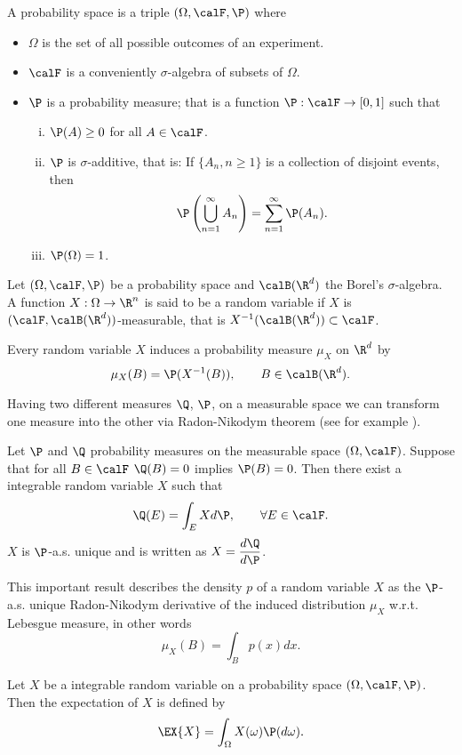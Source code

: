 	A probability space is a triple $(\Omega, \calF, \P)$ where
\begin{itemize}
	\item $\Omega$ is the set of all possible outcomes of an experiment.
	\item $\calF$ is a conveniently $\sigma$-algebra of subsets of $\Omega$.
	\item $\P$ is a probability measure; that is a function $\P: \calF \to [0,1]$ such that
	\begin{enumerate}[(i)]
		\item
			$\P(A)\geq 0$ for all $A \in \calF$.
		\item
			$\P$ is $\sigma$-additive, that is: If $\{A_n,  n\geq 1 \}$ is a collection of disjoint events,
			then
				$$
					\P \left(
						\bigcup_{n=1}^{\infty} A_n
					\right)= \sum_{n=1}^{\infty}
						\P(A_n).
				$$
		\item
			$\P(\Omega) = 1$.
	\end{enumerate}
\end{itemize}
\begin{definition}
	Let $(\Omega, \calF, \P)$ be a probability space and $\calB(\R^d)$ the Borel's $\sigma$-algebra. A  function $X:\Omega \to \R^n$ is said to be a random variable if $X$ is $(\calF,\calB(\R^d))$-measurable, that is
	$
		X^{-1}(\calB(\R^d))\subset \calF
	$.
\end{definition}
	Every random variable $X$ induces a probability measure $\mu_X$ on $\R^d$ by
	$$
		\mu_{X}(B) = \P(X^{-1}(B)), \qquad B\in\calB(\R^d).
	$$ 
%

	Having two different measures $\Q$, $\P$, on a measurable space we can transform one measure into the
other via  Radon-Nikodym theorem  (see for example \cite[Thm. 10.1.2]{Williams1991}).

\begin{thm}
	Let $\P$ and $\Q$ probability measures on the measurable space $(\Omega,\calF)$. Suppose that for all
	$B\in\calF$ $\Q(B)=0$ implies $\P(B)=0$. Then there exist a integrable random variable $X$ such that
	$$
		\Q(E) = \int_{E}Xd\P, \qquad \forall E\in\calF.
	$$
	$X$ is $\P$-a.s. unique and is written as $\displaystyle X = \frac{d\Q}{d\P}$.
\end{thm}
	This important result describes the density $p$ of a random variable $X$ as the $\P$-a.s.
unique Radon-Nikodym derivative of the induced distribution $\mu_{X}$ w.r.t. Lebesgue measure, in other 
words
$$
	\mu_{X}(B)=\int_{B} p(x)dx.
$$

\begin{definition}[Expectation]
	Let $X$ be a integrable random variable on a probability space $(\Omega, \calF, \P)$. Then the expectation
	of $X$ is defined by
	\begin{equation*}
		\EX{X}= \int_{\Omega} X(\omega) \P(d\omega).
	\end{equation*}
\end{definition}
